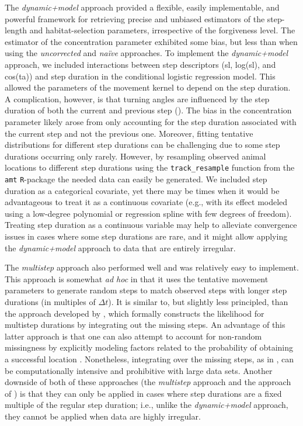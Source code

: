 \documentclass[../FinalThesis.tex]{subfiles}
\begin{document}
The \textit{dynamic+model} approach provided a flexible, easily implementable,
and powerful framework for retrieving precise and unbiased estimators of the
step-length and habitat-selection parameters, irrespective of the forgiveness
level. The estimator of the concentration parameter exhibited some bias, but
less than when using the \textit{uncorrected} and \textit{na\"ive} approaches.
To implement the \textit{dynamic+model} approach, we included interactions
between step descriptors (sl, log(sl), and cos(ta)) and step duration in the
conditional logistic regression model. This allowed the parameters of the
movement kernel to depend on the step duration. A complication, however, is that
turning angles are influenced by the step duration of both the current and
previous step (). The bias in the concentration parameter
likely arose from only accounting for the step duration associated with the
current step and not the previous one. Moreover, fitting tentative distributions
for different step durations can be challenging due to some step durations
occurring only rarely. However, by resampling observed animal locations to
different step durations using the \texttt{track\_resample} function from the
\texttt{amt} \texttt{R}-package \citep{Signer.2019} the needed data can easily
be generated. We included step duration as a categorical covariate, yet there
may be times when it would be advantageous to treat it as a continuous covariate
(e.g., with its effect modeled using a low-degree polynomial or regression
spline with few degrees of freedom). Treating step duration as a continuous
variable may help to alleviate convergence issues in cases where some step
durations are rare, and it might allow applying the \textit{dynamic+model}
approach to data that are entirely irregular.

The \textit{multistep} approach also performed well and was relatively easy to
implement. This approach is somewhat \textit{ad hoc} in that it uses the
tentative movement parameters to generate random steps to match observed steps
with longer step durations (in multiples of $\Delta t$). It is similar to, but
slightly less principled, than the approach developed by \citet{Vales.2022},
which formally constructs the likelihood for multistep durations by integrating
out the missing steps. An advantage of this latter approach is that one can also
attempt to account for non-random missingness by explicitly modeling factors
related to the probability of obtaining a successful location
\citep{Vales.2022}. Nonetheless, integrating over the missing steps, as in
\citet{Vales.2022}, can be computationally intensive and prohibitive with large
data sets. Another downside of both of these approaches (the \textit{multistep}
approach and the approach of \citealp{Vales.2022}) is that they can only be
applied in cases where step durations are a fixed multiple of the regular
step duration; i.e., unlike the \textit{dynamic+model} approach, they cannot be
applied when data are highly irregular.
\end{document}
